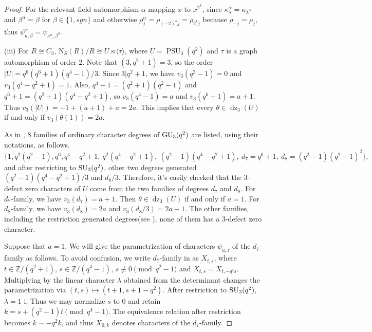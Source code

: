 \documentclass[11pt,a4paper]{article}
\numberwithin{equation}{section}
\theoremstyle{definition}
\theoremstyle{remark}
\DeclareMathOperator{\PSU}{PSU}
\newcommand{\dz}{\operatorname{dz}}
\newcommand{\NN}{\mathrm N}
\begin{document}
\begin{proof}
For the relevant field automorphism $\alpha$ mapping $x$ to $x^{2^k}$, since $\kappa_\lambda^\alpha=\kappa_{\lambda^\alpha}$ and
$\beta^\alpha=\beta$ for $\beta\in\{1,sgn\}$ and otherwise 
$\rho_j^\alpha=\rho_{(-2)^kj}=\rho_{2^kj}$ because $\rho_{-j}=\rho_j$, thus $\psi_{\kappa,\beta}^\alpha=\psi_{\kappa^\alpha,\beta^\alpha}$.


(iii) For $R\cong C_3$, $\NN_S(R)/R\cong U\rtimes\langle\tau\rangle$, where $U=\PSU_3(q^2)$ and $\tau$ is a graph automorphism of order $2$. 
Note that $(3, q^2+1)=3$, so the order $|U|=q^6(q^6+1)(q^4-1)/3$. Since \(3|q^2+1\), we have $v_3(q^2-1)=0$ and $v_3(q^4-q^2+1)=1$. Also, $q^4-1=(q^2+1)(q^2-1)$ and $q^6+1=(q^2+1)(q^4-q^2+1)$, so $v_3(q^4-1)=a$ and $v_3(q^6+1)=a+1$. Thus $v_3(|U|)=-1+(a+1)+a=2a$. This implies that every $\theta\in\dz_3(U)$ if and only if $v_3(\theta(1))=2a$.

As in \cite[Sections~2.1 and~3.1]{Orevkov}, $8$ families of ordinary character degrees of ${\rm GU}_3(q^2)$ are listed,
using their notations, as follows.
\[
\{1,q^2(q^2-1),q^6,q^4-q^2+1,\ q^2(q^4-q^2+1),\ (q^2-1)(q^4-q^2+1),\ d_7=q^6+1,\ d_8=(q^2-1)(q^2+1)^2\},
\]
and after restricting to \({\rm SU}_3(q^2)\), other two degrees generated $(q^2-1)(q^4-q^2+1)/3$ and $d_8/3$.
Therefore,  it's easily checked that the $3$-defect zero characters of $U$ come from the two families of degrees $d_7$ and $d_8$. For $d_7$-family, we have $v_3(d_7)=a+1$. Then $\theta\in\dz_3(U)$ if and only if $a=1$.  For $d_8$-family, we have $v_3(d_8)=2a$ and $v_3(d_8/3)=2a-1$. The other families, including the restriction generated degrees(see \cite[Section 3.1]{Orevkov}), none of them has a \(3\)-defect zero character.

Suppose that $a=1$. We will give the parametrization of characters $\psi_{u,z}$ of the $d_7$-family as follows.
To avoid confusion, we write \(d_7\)-family in \cite{Orevkov} as $X_{t,s}$, where $t\in{\mathbb Z}/(q^2+1)$, $s\in{\mathbb Z}/(q^4-1)$, $s\not\equiv0\pmod{q^2-1}$ and 
$X_{t,s}=X_{t,-q^2s}$. Multiplying by the linear character $\lambda$ obtained from the determinant changes the parametrization via
$(t,s)\longmapsto(t+1,s+1-q^2)$. After restriction to \({\rm SU}_3(q^2)\), $\lambda=1$ i. Thus we may normalize $s$ to \(0\) and retain  $k=s+(q^2-1)t\pmod{q^4-1}$. The equivalence relation after restriction becomes $k\sim -q^2k$, and thus
$X_{0,k}$ denotes characters of the \(d_7\)-family.


\end{proof}
\end{document}
